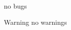 
\begin{DoxyRefList}
\item[\label{bug__bug000001}%
\hypertarget{bug__bug000001}{}%
Class \hyperlink{class_b___movable}{B\+\_\+\+Movable} ]no bugs \begin{DoxyWarning}{Warning}
no warnings 
\end{DoxyWarning}

\end{DoxyRefList}